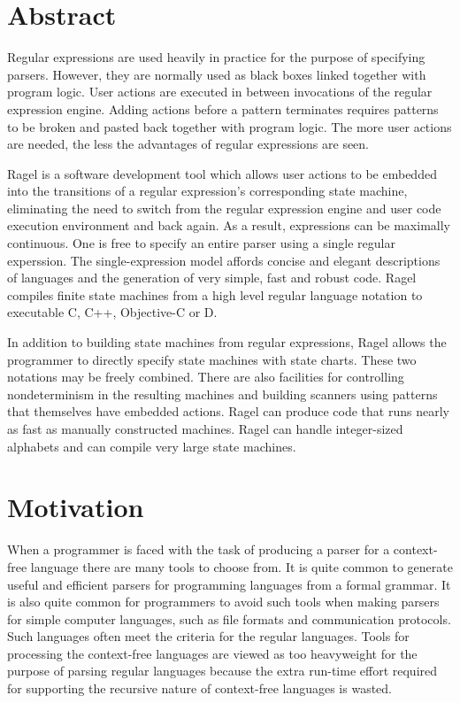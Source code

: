 \documentclass[letterpaper,11pt,oneside]{book}
\begin{document}
\section{Abstract}

Regular expressions are used heavily in practice for the purpose of specifying
parsers. However, they are normally used as black boxes linked together with
program logic.  User actions are executed in between invocations of the regular
expression engine. Adding actions before a pattern terminates requires patterns
to be broken and pasted back together with program logic. The more user actions
are needed, the less the advantages of regular expressions are seen. 

Ragel is a software development tool which allows user actions to be 
embedded into the transitions of a regular expression's corresponding state
machine, eliminating the need to switch from the regular expression engine and
user code execution environment and back again. As a result, expressions can be
maximally continuous.  One is free to specify an entire parser using a single
regular experssion.  The single-expression model affords concise and elegant
descriptions of languages and the generation of very simple, fast and robust
code.  Ragel compiles finite state machines from a high level regular language
notation to executable C, C++, Objective-C or D. 

In addition to building state machines from regular expressions, Ragel allows
the programmer to directly specify state machines with state charts. These two
notations may be freely combined. There are also facilities for controlling
nondeterminism in the resulting machines and building scanners using patterns
that themselves have embedded actions. Ragel can produce code that runs
nearly as fast as manually constructed machines.  Ragel can handle
integer-sized alphabets and can compile very large state machines.

\section{Motivation}

When a programmer is faced with the task of producing a parser for a
context-free language there are many tools to choose from. It is quite common
to generate useful and efficient parsers for programming languages from a
formal grammar. It is also quite common for programmers to avoid such tools
when making parsers for simple computer languages, such as file formats and
communication protocols.  Such languages often meet the criteria for the
regular languages.  Tools for processing the context-free languages are viewed
as too heavyweight for the purpose of parsing regular languages because the extra
run-time effort required for supporting the recursive nature of context-free
languages is wasted.
\end{document}
